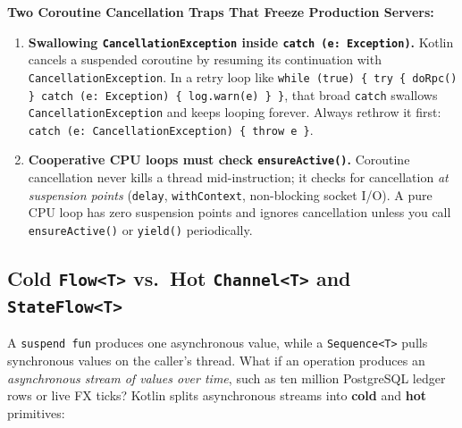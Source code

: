 \begin{trapbox}
\textbf{Two Coroutine Cancellation Traps That Freeze Production Servers:}
\begin{enumerate}
  \item \textbf{Swallowing \texttt{CancellationException} inside \texttt{catch (e: Exception)}.} Kotlin cancels a suspended coroutine by resuming its continuation with \texttt{CancellationException}. In a retry loop like \texttt{while (true) \{ try \{ doRpc() \} catch (e: Exception) \{ log.warn(e) \} \}}, that broad \texttt{catch} swallows \texttt{CancellationException} and keeps looping forever. Always rethrow it first: \texttt{catch (e: CancellationException) \{ throw e \}}.
  \item \textbf{Cooperative CPU loops must check \texttt{ensureActive()}.} Coroutine cancellation never kills a thread mid-instruction; it checks for cancellation \emph{at suspension points} (\texttt{delay}, \texttt{withContext}, non-blocking socket I/O). A pure CPU loop has zero suspension points and ignores cancellation unless you call \texttt{ensureActive()} or \texttt{yield()} periodically.
\end{enumerate}
\end{trapbox}

\subsection{Cold \texttt{Flow<T>} vs.\ Hot \texttt{Channel<T>} and \texttt{StateFlow<T>}}

A \texttt{suspend fun} produces one asynchronous value, while a \texttt{Sequence<T>} pulls synchronous values on the caller's thread. What if an operation produces an \emph{asynchronous stream of values over time}, such as ten million PostgreSQL ledger rows or live FX ticks? Kotlin splits asynchronous streams into \textbf{cold} and \textbf{hot} primitives:


